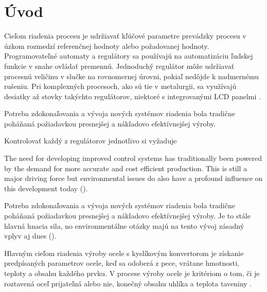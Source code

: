 \documentclass[]{tukediphc}
\begin{document}
\renewcommand\theHfigure{\theHsection.\arabic{figure}}
\renewcommand\theHtable{\theHsection.\arabic{table}}


\prvastrana


\thispagestyle{empty}
\tableofcontents
\newpage
%
%


\setcounter{page}{1}
\setcounter{equation}{0}
\setcounter{figure}{0}
\setcounter{table}{0}

\section{Úvod}

Cieľom riadenia procesu je udržiavať kľúčové parametre prevádzky procesu v úzkom rozmedzí referenčnej hodnoty alebo požadovanej hodnoty. Programovateľné automaty a regulátory sa používajú na automatizáciu ľudskej funkcie v snahe ovládať premennú. Jednoduchý regulátor môže udržiavať procesnú veličinu v slučke na rovnomernej úrovni, pokiaľ nedôjde k nadmernému rušeniu. Pri komplexných procesoch, ako sú tie v metalurgii, sa využívajú desiatky až stovky takýchto regulátorov, niektoré s integrovanými LCD panelmi \citep{Al-Megren2016}.

Potreba zdokonaľovania a vývoja nových systémov riadenia bola tradične poháňaná požiadavkou presnejšej a nákladovo efektívnejšej výroby. 

Kontrolovať každý z regulátorov jednotlivo si vyžaduje 

The need for developing improved control systems has traditionally been powered by the demand for more accurate and cost efficient production. This is still a major driving force but environmental issues do also have a profound influence on this development today (\cite{Widlund1998}).

Potreba zdokonaľovania a vývoja nových systémov riadenia bola tradične poháňaná požiadavkou presnejšej a nákladovo efektívnejšej výroby. Je to stále hlavná hnacia sila, no environmentálne otázky majú na tento vývoj zásadný vplyv aj dnes (\cite{Widlund1998}).

Hlavným cieľom riadenia výroby ocele s kyslíkovým konvertorom je získanie predpísaných parametrov ocele, keď sa odoberá z pece, vrátane hmotnosti, teploty a obsahu každého prvku. V procese výroby ocele je kritériom o tom, či je roztavená oceľ prijateľná alebo nie, konečný obsahu uhlíka a teplota taveniny \cite{Wang2010}.
\end{document}
